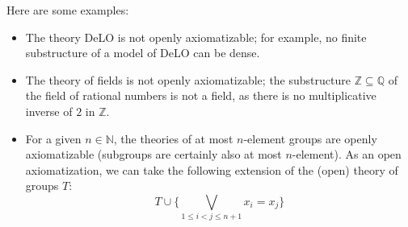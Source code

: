 \begin{example}
    Here are some examples:
    \begin{itemize}
        \item The theory DeLO is not openly axiomatizable; for example, no finite substructure of a model of DeLO can be dense.
        \item The theory of fields is not openly axiomatizable; the substructure $\mathbb{Z} \subseteq \mathbb{Q}$ of the field of rational numbers is not a field, as there is no multiplicative inverse of $2$ in $\mathbb{Z}$.
        \item For a given $n \in \mathbb{N}$, the theories of at most $n$-element groups are openly axiomatizable (subgroups are certainly also at most $n$-element). As an open axiomatization, we can take the following extension of the (open) theory of groups $T$:
        $$
        T \cup \{\bigvee_{1 \leq i < j \leq n+1} x_i = x_j\}
        $$
    \end{itemize}
\end{example}
